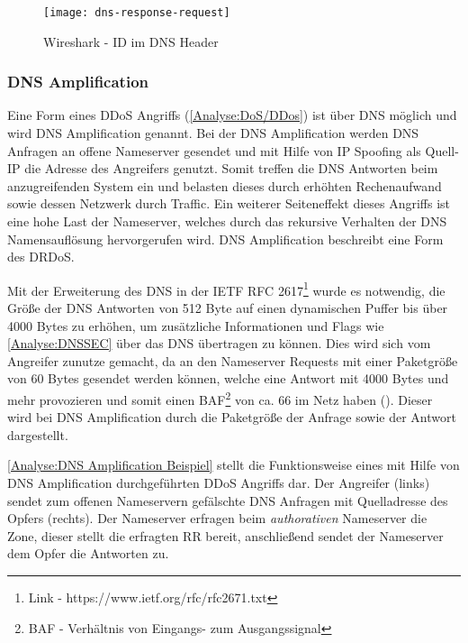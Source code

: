 \begin{figure}[h]
    \centering
    \texttt{[image: dns-response-request]}
    \caption{Wireshark - ID im DNS Header}
    \label{Analyse:DNS Request Response}
  \end{figure}
  
\clearpage

\subsubsection{\ac{DNS} Amplification}
\label{Analyse:DNS Amplification}
Eine Form eines \ac{DDoS} Angriffs (\autoref{Analyse:DoS/DDos}) ist über \ac{DNS} möglich und wird \ac{DNS} Amplification genannt. Bei der \ac{DNS} Amplification werden \ac{DNS} Anfragen an offene Nameserver gesendet und mit Hilfe von \ac{IP} Spoofing als Quell-\ac{IP} die Adresse des Angreifers genutzt. Somit treffen die \ac{DNS} Antworten beim anzugreifenden System ein und belasten dieses durch erhöhten Rechenaufwand sowie dessen Netzwerk durch Traffic. Ein weiterer Seiteneffekt dieses Angriffs ist eine hohe Last der Nameserver, welches durch das rekursive Verhalten der \ac{DNS} Namensauflösung hervorgerufen wird. \ac{DNS} Amplification beschreibt eine Form des \ac{DRDoS}.

Mit der Erweiterung des \ac{DNS} in der \ac{IETF} \ac{RFC} 2617\footnote{Link - https://www.ietf.org/rfc/rfc2671.txt} wurde es notwendig, die Größe der \ac{DNS} Antworten von 512 Byte auf einen dynamischen Puffer bis über 4000 Bytes zu erhöhen, um zusätzliche Informationen und Flags wie \autoref{Analyse:DNSSEC} über das \ac{DNS} übertragen zu können. Dies wird sich vom Angreifer zunutze gemacht, da an den Nameserver Requests mit einer Paketgröße von 60 Bytes gesendet werden können, welche eine Antwort mit 4000 Bytes und mehr provozieren und somit einen \ac{BAF}\footnote{BAF - Verhältnis von Eingangs- zum Ausgangssignal} von ca. 66 im Netz haben (\cite{Ledermueller2009}). Dieser wird bei \ac{DNS} Amplification durch die Paketgröße der Anfrage sowie der Antwort dargestellt.

\autoref{Analyse:DNS Amplification Beispiel} stellt die Funktionsweise eines mit Hilfe von \ac{DNS} Amplification durchgeführten \ac{DDoS} Angriffs dar. Der Angreifer (links) sendet zum offenen Nameservern gefälschte \ac{DNS} Anfragen mit Quelladresse des Opfers (rechts). Der Nameserver erfragen beim \textit{authorativen} Nameserver die Zone, dieser stellt die erfragten \ac{RR} bereit, anschließend sendet der Nameserver dem Opfer die Antworten zu.

